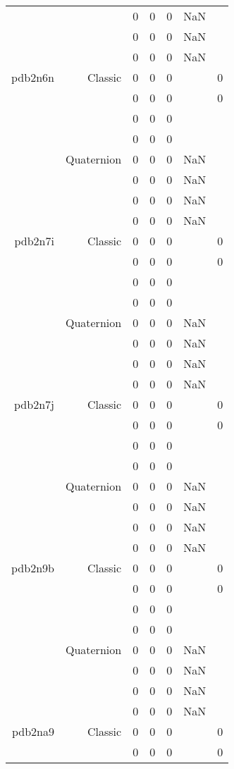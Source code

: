 \begin{xltabular}{\textwidth}{r|rcccSc}
& & 0 & 0 & 0 & NaN & \\
& & 0 & 0 & 0 & NaN & \\
& & 0 & 0 & 0 & NaN & \\ \addlinespace
pdb2n6n & Classic & 0 & 0 & 0 & & 0 \\
& & 0 & 0 & 0 & & 0 \\
& & 0 & 0 & 0 & & \\
& & 0 & 0 & 0 & & \\
& Quaternion & 0 & 0 & 0 & NaN & \\
& & 0 & 0 & 0 & NaN & \\
& & 0 & 0 & 0 & NaN & \\
& & 0 & 0 & 0 & NaN & \\ \addlinespace
pdb2n7i & Classic & 0 & 0 & 0 & & 0 \\
& & 0 & 0 & 0 & & 0 \\
& & 0 & 0 & 0 & & \\
& & 0 & 0 & 0 & & \\
& Quaternion & 0 & 0 & 0 & NaN & \\
& & 0 & 0 & 0 & NaN & \\
& & 0 & 0 & 0 & NaN & \\
& & 0 & 0 & 0 & NaN & \\ \addlinespace
pdb2n7j & Classic & 0 & 0 & 0 & & 0 \\
& & 0 & 0 & 0 & & 0 \\
& & 0 & 0 & 0 & & \\
& & 0 & 0 & 0 & & \\
& Quaternion & 0 & 0 & 0 & NaN & \\
& & 0 & 0 & 0 & NaN & \\
& & 0 & 0 & 0 & NaN & \\
& & 0 & 0 & 0 & NaN & \\ \addlinespace
pdb2n9b & Classic & 0 & 0 & 0 & & 0 \\
& & 0 & 0 & 0 & & 0 \\
& & 0 & 0 & 0 & & \\
& & 0 & 0 & 0 & & \\
& Quaternion & 0 & 0 & 0 & NaN & \\
& & 0 & 0 & 0 & NaN & \\
& & 0 & 0 & 0 & NaN & \\
& & 0 & 0 & 0 & NaN & \\ \addlinespace
pdb2na9 & Classic & 0 & 0 & 0 & & 0 \\
& & 0 & 0 & 0 & & 0 \\

\end{xltabular}
